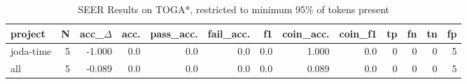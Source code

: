 \begin{table*}
\centering
\caption{SEER Results on TOGA*, restricted to minimum 95\% of tokens present}
\label{tab:toga_results_05}
\begin{tabular}{lrrrrrrrrrrrr}
\toprule
   project &  N &  acc\_$\Delta$ &  acc. &  pass\_acc. &  fail\_acc. &   f1 &  coin\_acc. &  coin\_f1 &  tp &  fn &  tn &  fp \\
\midrule
 joda-time &  5 &      -1.000 &   0.0 &        0.0 &        0.0 &  0.0 &      1.000 &      0.0 &   0 &   0 &   0 &   5 \\
       all &  5 &      -0.089 &   0.0 &        0.0 &        0.0 &  0.0 &      0.089 &      0.0 &   0 &   0 &   0 &   5 \\
\bottomrule
\end{tabular}
\end{table*}
